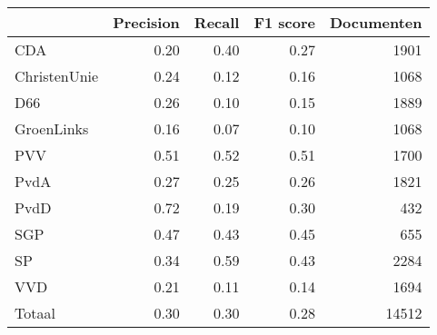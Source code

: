 \begin{tabular}{lrrrr}
\toprule
{} &  Precision &  Recall &  F1 score &  Documenten \\
\midrule
CDA          &       0.20 &    0.40 &      0.27 &        1901 \\
ChristenUnie &       0.24 &    0.12 &      0.16 &        1068 \\
D66          &       0.26 &    0.10 &      0.15 &        1889 \\
GroenLinks   &       0.16 &    0.07 &      0.10 &        1068 \\
PVV          &       0.51 &    0.52 &      0.51 &        1700 \\
PvdA         &       0.27 &    0.25 &      0.26 &        1821 \\
PvdD         &       0.72 &    0.19 &      0.30 &         432 \\
SGP          &       0.47 &    0.43 &      0.45 &         655 \\
SP           &       0.34 &    0.59 &      0.43 &        2284 \\
VVD          &       0.21 &    0.11 &      0.14 &        1694 \\
Totaal       &       0.30 &    0.30 &      0.28 &       14512 \\
\bottomrule
\end{tabular}
